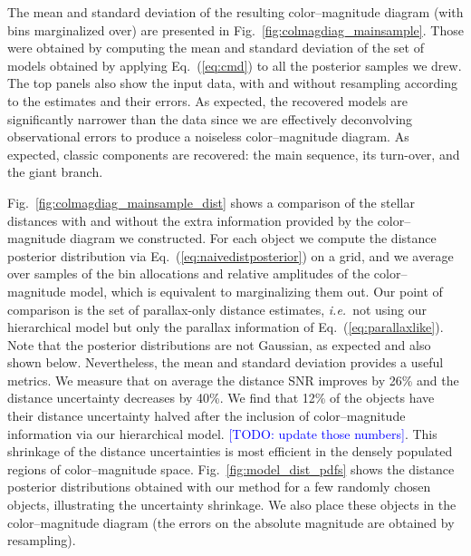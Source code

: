 \documentclass[manuscript, letterpaper]{aastex6}
\newcommand{\ie}{{\textit{i.e.}~}}
\newcommand{\equref}[1]{{\xspace}Eq.~(\ref{#1})}
\newcommand{\figref}[1]{{\xspace}Fig.~\ref{#1}}
\newcommand{\todo}[1]{\textcolor{blue}{[TODO: #1]}}
\begin{document}
The mean and standard deviation of the resulting color--magnitude diagram (with bins marginalized over) are presented in \figref{fig:colmagdiag_mainsample}.
Those were obtained by computing the mean and standard deviation of the set of models obtained by applying \equref{eq:cmd} to all the posterior samples we drew.   
The top panels also show the input data, with and without resampling according to the estimates and their errors.
As expected, the recovered models are significantly narrower than the data since we are effectively deconvolving observational errors to produce a noiseless color--magnitude diagram. 
As expected, classic components are recovered: the main sequence, its turn-over, and the giant branch.

\figref{fig:colmagdiag_mainsample_dist} shows a comparison of the stellar distances with and without the extra information provided by the color--magnitude diagram we constructed.
For each object we compute the distance posterior distribution via \equref{eq:naivedistposterior} on a grid, and we average over samples of the bin allocations and relative amplitudes of the color--magnitude model, which is equivalent to marginalizing them out.
Our point of comparison is the set of parallax-only distance estimates, \ie not using our hierarchical model but only the parallax information of \equref{eq:parallaxlike}.
Note that the posterior distributions are not Gaussian, as expected and also shown below. 
Nevertheless, the mean and standard deviation provides a useful metrics. 
We measure that on average the distance SNR improves by 26\% and the distance uncertainty decreases by 40\%.
We find that 12\% of the objects have their distance uncertainty halved after the inclusion of color--magnitude information via our hierarchical model. 
\todo{update those numbers}.
This shrinkage of the distance uncertainties is most efficient in the densely populated regions of color--magnitude space.
\figref{fig:model_dist_pdfs} shows the distance posterior distributions obtained with our method for a few randomly chosen objects, illustrating the uncertainty shrinkage.
We also place these objects in the color--magnitude diagram (the errors on the absolute magnitude are obtained by resampling).
\end{document}
